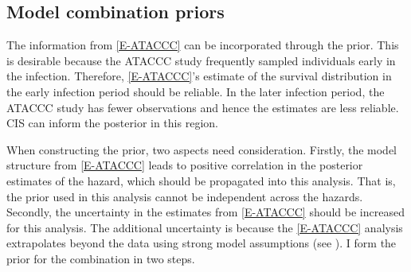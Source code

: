 \documentclass[thesis.tex]{subfiles}
\begin{document}
\subsection{Model combination priors} \label{perf-test:sec:informative-priors}

The information from \cref{E-ATACCC} can be incorporated through the prior.
This is desirable because the ATACCC study frequently sampled individuals early in the infection.
Therefore, \cref{E-ATACCC}'s estimate of the survival distribution in the early infection period should be reliable.
In the later infection period, the ATACCC study has fewer observations and hence the estimates are less reliable.
CIS can inform the posterior in this region.

When constructing the prior, two aspects need consideration.
Firstly, the model structure from \cref{E-ATACCC} leads to positive correlation in the posterior estimates of the hazard, which should be propagated into this analysis.
That is, the prior used in this analysis cannot be independent across the hazards.
Secondly, the uncertainty in the estimates from \cref{E-ATACCC} should be increased for this analysis.
The additional uncertainty is because the \cref{E-ATACCC} analysis extrapolates beyond the data using strong model assumptions (see ).
I form the prior for the combination in two steps.
\end{document}
